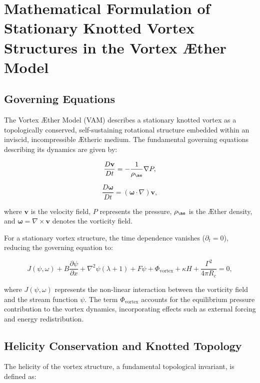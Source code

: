 
\section{Mathematical Formulation of Stationary Knotted Vortex Structures in the Vortex \AE ther Model}

\subsection{Governing Equations}
The Vortex \AE ther Model (VAM) describes a stationary knotted vortex as a topologically conserved, self-sustaining rotational structure embedded within an inviscid, incompressible \AE theric medium. The fundamental governing equations describing its dynamics are given by:

\begin{equation}
\frac{D \mathbf{v}}{Dt} = -\frac{1}{\rho_{\ae}} \nabla P,
\end{equation}

\begin{equation}
\frac{D \boldsymbol{\omega}}{Dt} = (\boldsymbol{\omega} \cdot \nabla) \mathbf{v},
\end{equation}

where $\mathbf{v}$ is the velocity field, $P$ represents the pressure, $\rho_{\ae}$ is the \AE ther density, and $\boldsymbol{\omega} = \nabla \times \mathbf{v}$ denotes the vorticity field.

For a stationary vortex structure, the time dependence vanishes ($\partial_t = 0$), reducing the governing equation to:

\begin{equation}
J(\psi, \omega) + B \frac{\partial \psi}{\partial x} + \nabla^2 \psi (\lambda + 1) + F \psi + \Phi_{\text{vortex}} + \kappa H + \frac{\Gamma^2}{4 \pi R_c} = 0,
\end{equation}

where $J(\psi, \omega)$ represents the non-linear interaction between the vorticity field and the stream function $\psi$. The term $\Phi_{\text{vortex}}$ accounts for the equilibrium pressure contribution to the vortex dynamics, incorporating effects such as external forcing and energy redistribution.

\subsection{Helicity Conservation and Knotted Topology}
The helicity of the vortex structure, a fundamental topological invariant, is defined as:

